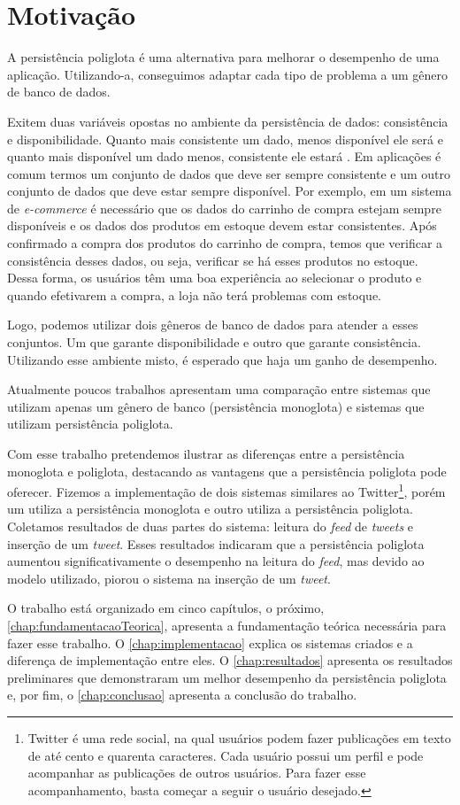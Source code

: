 \section{Motivação}
\label{sec:motivacao}
A persistência poliglota é uma alternativa para melhorar o desempenho de uma aplicação. Utilizando-a, conseguimos adaptar cada tipo de problema a um gênero de banco de dados.

Exitem duas variáveis opostas no ambiente da persistência de dados: consistência e disponibilidade. Quanto mais consistente um dado, menos disponível ele será e quanto mais disponível um dado menos, consistente ele estará \cite{NoSQL}. Em aplicações é comum termos um conjunto de dados que deve ser sempre consistente e um outro conjunto de dados que deve estar sempre disponível. Por exemplo, em um sistema de \textit{e-commerce} é necessário que os dados do carrinho de compra estejam sempre disponíveis e os dados dos produtos em estoque devem estar consistentes. Após confirmado a compra dos produtos do carrinho de compra, temos que verificar a consistência desses dados, ou seja, verificar se há esses produtos no estoque. Dessa forma, os usuários têm uma boa experiência ao selecionar o produto e quando efetivarem a compra, a loja não terá problemas com estoque.

Logo, podemos utilizar dois gêneros de banco de dados para atender a esses conjuntos. Um que garante disponibilidade e outro que garante  consistência. Utilizando esse ambiente misto, é esperado que haja um ganho de desempenho.

Atualmente poucos trabalhos apresentam uma comparação entre sistemas que utilizam apenas um gênero de banco (persistência monoglota)  e sistemas que utilizam persistência poliglota. 

Com esse trabalho pretendemos ilustrar as diferenças entre a persistência monoglota e poliglota, destacando as vantagens que a persistência poliglota pode oferecer. Fizemos a implementação de dois sistemas similares ao Twitter\footnote{Twitter é uma rede social, na qual usuários podem fazer publicações em texto de até cento e quarenta caracteres. Cada usuário possui um perfil e pode acompanhar as publicações de outros usuários. Para fazer esse acompanhamento, basta começar a seguir o usuário desejado.}, porém um utiliza a persistência monoglota e outro utiliza a persistência poliglota. Coletamos resultados de duas partes do sistema: leitura do \textit{feed} de \textit{tweets} e inserção de um \textit{tweet}. Esses resultados indicaram que a persistência poliglota aumentou significativamente o desempenho na leitura do \textit{feed}, mas devido ao modelo utilizado, piorou o sistema na inserção de um \textit{tweet}.

O trabalho está organizado em cinco capítulos, o próximo, \autoref{chap:fundamentacaoTeorica}, apresenta a fundamentação teórica necessária para fazer esse trabalho. O \autoref{chap:implementacao} explica os sistemas criados e a diferença de implementação entre eles. O \autoref{chap:resultados} apresenta os resultados preliminares que demonstraram um melhor desempenho da persistência poliglota e, por fim, o \autoref{chap:conclusao} apresenta a conclusão do trabalho.





